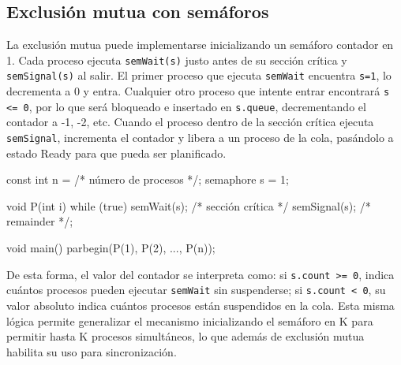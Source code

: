 \subsection{Exclusión mutua con semáforos}

La exclusión mutua puede implementarse inicializando un semáforo contador en 1. Cada proceso ejecuta \texttt{semWait(s)} justo antes de su sección crítica y \texttt{semSignal(s)} al salir. El primer proceso que ejecuta \texttt{semWait} encuentra \texttt{s=1}, lo decrementa a 0 y entra. Cualquier otro proceso que intente entrar encontrará \texttt{s <= 0}, por lo que será bloqueado e insertado en \texttt{s.queue}, decrementando el contador a -1, -2, etc. Cuando el proceso dentro de la sección crítica ejecuta \texttt{semSignal}, incrementa el contador y libera a un proceso de la cola, pasándolo a estado Ready para que pueda ser planificado.

\begin{ccode}[title=Programa de exclusión mutua con semáforo contador]
const int n = /* número de procesos */;
semaphore s = 1;

void P(int i) {
  while (true) {
    semWait(s);
    /* sección crítica */
    semSignal(s);
    /* remainder */;
  }
}

void main() {
  parbegin(P(1), P(2), ..., P(n));
}
\end{ccode}

De esta forma, el valor del contador se interpreta como: si \texttt{s.count >= 0}, indica cuántos procesos pueden ejecutar \texttt{semWait} sin suspenderse; si \texttt{s.count < 0}, su valor absoluto indica cuántos procesos están suspendidos en la cola. Esta misma lógica permite generalizar el mecanismo inicializando el semáforo en K para permitir hasta K procesos simultáneos, lo que además de exclusión mutua habilita su uso para sincronización.
